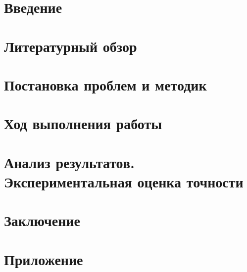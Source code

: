 \documentclass[14pt,a4paper]{extarticle}
\begin{document}
\pagestyle{plain}
\clearpage
\tableofcontents
\newpage
\section{Введение}

\section{Литературный обзор} \label{sec:literature_review}

\section{Постановка проблем и методик}

%

\section{Ход выполнения работы}

\section{Анализ результатов. Экспериментальная оценка точности}

\section{Заключение}

\section{Приложение}

\end{document}
